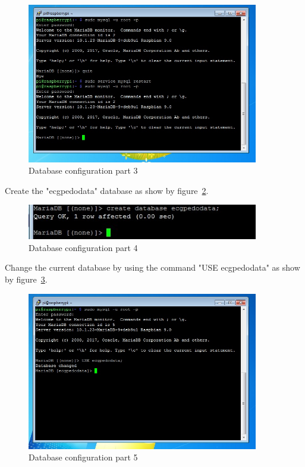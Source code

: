 \documentclass[12pt,]{article}
\begin{document}
\begin{figure}[H]
  	\begin{center}
    	\includegraphics[width=0.9\textwidth]{Ras_26}
  	\end{center}
  	\caption{Database configuration part 3}
	\label{fig:44}
\end{figure}
Create the "ecgpedodata" database as show by figure~\ref{fig:45}.
\begin{figure}[H]
  	\begin{center}
    	\includegraphics[width=0.9\textwidth]{Ras_29}
  	\end{center}
  	\caption{Database configuration part 4}
	\label{fig:45}
\end{figure}
Change the current database by using the command "USE ecgpedodata" as show by figure~\ref{fig:46}.
\begin{figure}[H]
  	\begin{center}
    	\includegraphics[width=0.9\textwidth]{Ras_30}
  	\end{center}
  	\caption{Database configuration part 5}
	\label{fig:46}
\end{figure}
\end{document}
